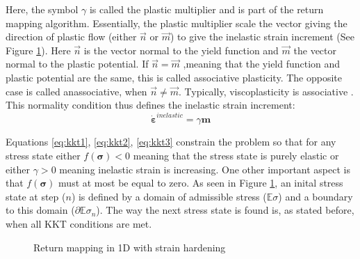 \documentclass[final,5p,times,twocolumn]{elsarticle}
\begin{document}
Here, the symbol $\gamma$ is called the plastic multiplier and is part of the return mapping algorithm. Essentially, the plastic multiplier scale the vector giving the direction of plastic flow (either $\vec{n}$ or $\vec{m}$) to give the inelastic strain increment (See Figure \ref{fig:returnmap}). Here $\vec{n}$ is the vector normal to the yield function and $\vec{m}$ the vector normal to the plastic potential. If $\vec{n}=\vec{m}$ ,meaning that the yield function and plastic potential are the same, this is called associative plasticity. The opposite case is called anassociative, when $\vec{n} \neq \vec{m}$. Typically, viscoplasticity is associative \cite{MACrisfield2012,Simo1998Computational}. This normality condition thus defines the inelastic strain increment:
\begin{equation}
  \boldsymbol{\dot{\varepsilon}}^{inelastic}=\gamma \boldsymbol{m} \label{eq:normality}
\end{equation}

Equations \ref{eq:kkt1}, \ref{eq:kkt2}, \ref{eq:kkt3} constrain the problem so that for any stress state either $f(\boldsymbol{\sigma}) < 0$ meaning that the stress state is purely elastic or either $\gamma > 0$ meaning inelastic strain is increasing. One other important aspect is that $f(\boldsymbol{\sigma})$ must at most be equal to zero. As seen in Figure \ref{fig:returnmap}, an inital stress state at step ($n$) is defined by a domain of admissible stress ($\mathbb{E} \sigma$) and a boundary to this domain ($\partial \mathbb{E}\sigma_{n}$). The way the next stress state is found is, as stated before, when all KKT conditions are met.  

\begin{figure}
\centering
{}
\caption{Return mapping in 1D with strain hardening}
\label{fig:returnmap}
\end{figure}
\end{document}
